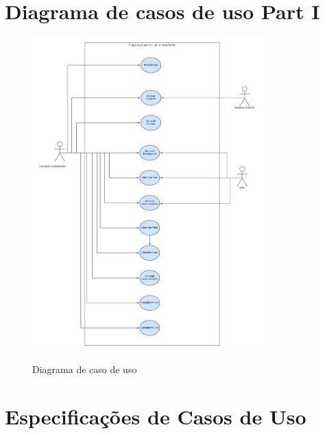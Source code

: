 
\begin{apendicesenv}

\partapendices

\chapter{Diagrama de casos de uso Part I}
\label{diagrama-casos-uso-old}

\begin{figure}[htb]
	\centering
	\caption{\label{fig_arq_virado}Diagrama de caso de uso}
	\includegraphics[width=0.80\textwidth]{anexos/casos_de_uso.jpeg}
	\label{diagrama-caso-uso}
\end{figure}



	\chapter{Especificações de Casos de Uso}
	\label{casos-de-uso-especificacao}
	

\end{apendicesenv}
